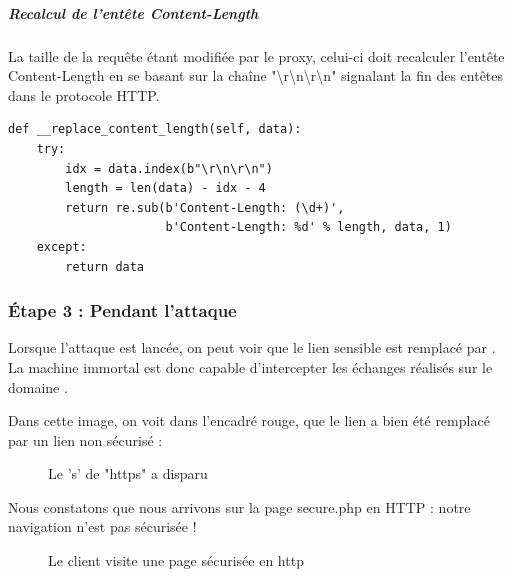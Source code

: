 \subparagraph{Recalcul de l'entête Content-Length}

La taille de la requête étant modifiée par le proxy, celui-ci doit recalculer l'entête Content-Length en se basant sur la chaîne "{\textbackslash}r{\textbackslash}n{\textbackslash}r{\textbackslash}n" signalant la fin des entêtes dans le protocole HTTP.

\begin{verbatim}
def __replace_content_length(self, data):
    try:
        idx = data.index(b"\r\n\r\n")
        length = len(data) - idx - 4
        return re.sub(b'Content-Length: (\d+)',
                      b'Content-Length: %d' % length, data, 1)
    except:
        return data
\end{verbatim}

\subsubsection{Étape 3 : Pendant l'attaque}

Lorsque l'attaque est lancée, on peut voir que le lien sensible  est remplacé par .
La machine immortal est donc capable d'intercepter les échanges réalisés sur le domaine .

Dans cette image, on voit dans l'encadré rouge, que le lien  a bien été remplacé par un lien non sécurisé  :

\begin{figure}[H]
  \caption{Le 's' de "https" a disparu}
\end{figure}

Nous constatons que nous arrivons sur la page secure.php en HTTP : notre navigation n'est pas sécurisée !

\begin{figure}[H]
  \caption{Le client visite une page sécurisée en http}
\end{figure}

